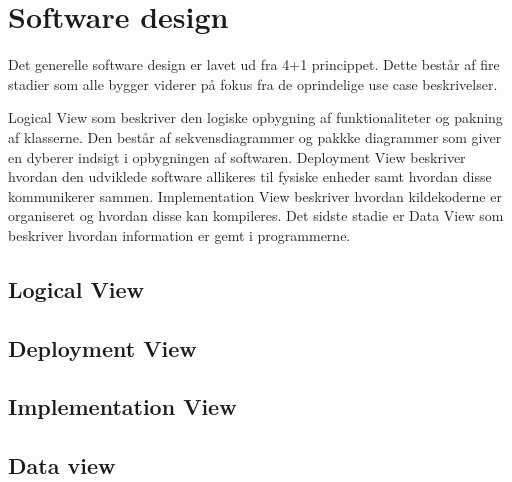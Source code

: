 \chapter{Software design}
Det generelle software design er lavet ud fra 4+1 princippet. Dette består af fire stadier som alle bygger viderer på fokus fra de oprindelige use case beskrivelser.

Logical View som beskriver den logiske opbygning af funktionaliteter og pakning af klasserne. Den består af sekvensdiagrammer og pakkke diagrammer som giver en dyberer indsigt i opbygningen af softwaren.\newline
Deployment View beskriver hvordan den udviklede software allikeres til fysiske enheder samt hvordan disse kommunikerer sammen.\newline
Implementation View beskriver hvordan kildekoderne er organiseret og hvordan disse kan kompileres.\newline
Det sidste stadie er Data View som beskriver hvordan information er gemt i programmerne.

\section{Logical View}


\section{Deployment View}


\section{Implementation View}



\section{Data view}

